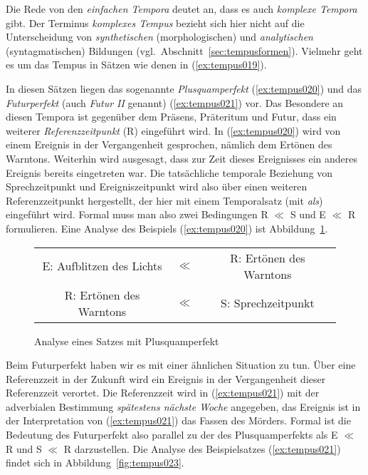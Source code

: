 Die Rede von den \textit{einfachen Tempora} deutet an, dass es auch \textit{komplexe Tempora} gibt.
Der Terminus \textit{komplexes Tempus} bezieht sich hier nicht auf die Unterscheidung von \textit{synthetischen} (morphologischen) und \textit{analytischen} (syntagmatischen) Bildungen (vgl.\ Abschnitt~\ref{sec:tempusformen}).
Vielmehr geht es um das Tempus in Sätzen wie denen in (\ref{ex:tempus019}).

\Np

\begin{exe}
  \ex\label{ex:tempus019}
  \begin{xlist}
  \end{xlist}
\end{exe}


In diesen Sätzen liegen das sogenannte \textit{Plusquamperfekt} (\ref{ex:tempus020}) und das \textit{Futurperfekt} (auch \textit{Futur II} genannt) (\ref{ex:tempus021}) vor.
Das Besondere an diesen Tempora ist gegenüber dem Präsens, Präteritum und Futur, dass ein weiterer \textit{Referenzzeitpunkt} (R) eingeführt wird.
In (\ref{ex:tempus020}) wird von einem Ereignis in der Vergangenheit gesprochen, nämlich dem Ertönen des Warntons.
Weiterhin wird ausgesagt, dass zur Zeit dieses Ereignisses ein anderes Ereignis bereits eingetreten war.
Die tatsächliche temporale Beziehung von Sprechzeitpunkt und Ereigniszeitpunkt wird also über einen weiteren Referenzzeitpunkt hergestellt, der hier mit einem Temporalsatz (mit \textit{als}) eingeführt wird.
Formal muss man also zwei Bedingungen R $\ll$ S und E $\ll$ R formulieren.
Eine Analyse des Beispiels (\ref{ex:tempus020}) ist Abbildung~\ref{fig:tempus022}.

\begin{figure}[!htbp]
  \centering
  \begin{tabular}{ccc}
    E: Aufblitzen des Lichts & $\ll$ & R: Ertönen des Warntons \\
    R: Ertönen des Warntons & $\ll$ & S: Sprechzeitpunkt \\
  \end{tabular}
  \caption{Analyse eines Satzes mit Plusquamperfekt}
  \label{fig:tempus022}
\end{figure}

Beim Futurperfekt haben wir es mit einer ähnlichen Situation zu tun.
Über eine Referenzzeit in der Zukunft wird ein Ereignis in der Vergangenheit dieser Referenzzeit verortet.
Die Referenzzeit wird in (\ref{ex:tempus021}) mit der adverbialen Bestimmung \textit{spätestens nächste Woche} angegeben, das Ereignis ist in der Interpretation von (\ref{ex:tempus021}) das Fassen des Mörders.
Formal ist die Bedeutung des Futurperfekt also parallel zu der des Plusquamperfekts als E $\ll$ R und  S $\ll$ R darzustellen.
Die Analyse des Beispielsatzes (\ref{ex:tempus021}) findet sich in Abbildung~\ref{fig:tempus023}.

